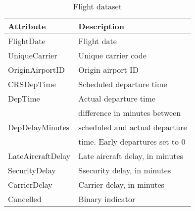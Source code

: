 \begin{table*}[!htb] \scriptsize
  \begin{subtable}{.5\linewidth}
    \centering
    \begin{tabular}[t]{|l|l|}
      \hline
      \bf{Attribute}    & \bf{Description}                  \\ \hline
      FlightDate        & Flight date                       \\ \hline
      UniqueCarrier	    & Unique carrier code               \\ \hline
      OriginAirportID   & Origin airport ID                 \\ \hline
      CRSDepTime        & Scheduled departure time          \\ \hline
      DepTime           & Actual departure time             \\ \hline
                        & difference in minutes between     \\
      DepDelayMinutes   & scheduled and actual departure    \\
                        & time. Early departures set to 0   \\ \hline
      LateAircraftDelay & Late aircraft delay, in minutes   \\ \hline
      SecurityDelay     & Ssecurity delay, in minutes       \\ \hline
      CarrierDelay      & Carrier delay, in minutes         \\ \hline
      Cancelled         & Binary indicator                  \\ \hline
    \end{tabular}
    \caption{Flight dataset}
  \end{subtable}


\end{table*}
